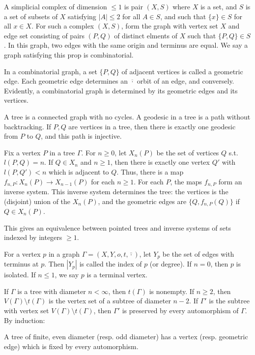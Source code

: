 \documentclass{article}
\begin{document}
A simplicial complex of dimension $\leq 1$ is pair $(X,S)$ where $X$ is a set, and $S$ is a set of subsets of $X$ satisfying $|A|\leq 2$ for all $A\in S$, and such that $\{x\} \in S$ for all $x\in X$. For such a complex $(X,S)$, form the graph with vertex set $X$ and edge set consisting of pairs $(P,Q)$ of distinct elments of $X$ such that $\{ P,Q \} \in S$. In this graph, two edges with the same origin and terminus are equal. We say a graph satisfying this prop is combinatorial.

In a combinatorial graph, a set $\{P,Q\}$ of adjacent vertices is called a geometric edge. Each geometric edge determines an $\overline{\cdot}$ orbit of an edge, and conversely. Evidently, a combinatorial graph is determined by its geometric edges and its vertices.

A tree is a connected graph with no cycles. A geodesic in a tree is a path without backtracking. If $P,Q$ are vertices in a tree, then there is exactly one geodesic from $P$ to $Q$, and this path is injective.

Fix a vertex $P$ in a tree $\Gamma$. For $n\geq 0$, let $X_n(P)$ be the set of vertices $Q$ s.t. $l(P,Q)=n$. If $Q \in X_n$ and $n\geq 1$, then there is exactly one vertex $Q'$ with $l(P,Q') <n$ which is adjacent to $Q$. Thus, there is a map $f_{n,P}:X_n(P)\to X_{n-1}(P)$ for each $n\geq 1$. For each $P$, the maps $f_{n,P}$ form an inverse system. This inverse system determines the tree: the vertices is the (disjoint) union of the $X_n(P)$, and the geometric edges are $\{Q,f_{n,P}(Q)\}$ if $Q \in X_n(P)$.

This gives an equivalence between pointed trees and inverse systems of sets indexed by integers $\geq 1$.

For a vertex $p$ in a graph $\Gamma=(X,Y,o,t,\bar{\cdot})$, let $Y_p$ be the set of edges with terminus at $p$. Then $|Y_p|$ is called the index of $p$ (or degree). If $n=0$, then $p$ is isolated. If $n\leq 1$, we say $p$ is a terminal vertex.

If $\Gamma$ is a tree with diameter $n<\infty$, then $t(\Gamma)$ is nonempty. If $n\geq 2$, then $V(\Gamma)\setminus t(\Gamma)$ is the vertex set of a subtree of diameter $n-2$. If $\Gamma'$ is the subtree with vertex set $V(\Gamma)\setminus t(\Gamma)$, then $\Gamma'$ is preserved by every automorphism of $\Gamma$. By induction:

\begin{lemma}
    A tree of finite, even diameter (resp. odd diameter) has a vertex (resp. geometric edge) which is fixed by every automorphism.
\end{lemma}
\end{document}
